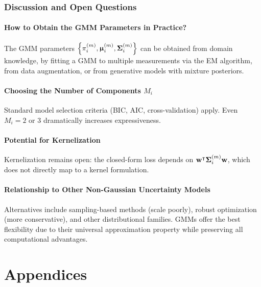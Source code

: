 \documentclass[11pt, letterpaper]{article}
\newcommand{\bSigma}{\vb{\Sigma}}
\newcommand{\bmu}{\boldsymbol{\upmu}}
\begin{document}
\section{Discussion and Open Questions}\label{sec:discussion}

\subsection{How to Obtain the GMM Parameters in Practice?}

The GMM parameters $\left\{\pi_i^{(m)}, \bmu_i^{(m)}, \bSigma_i^{(m)}\right\}$ can be obtained from domain knowledge, by fitting a GMM to multiple measurements via the EM algorithm, from data augmentation, or from generative models with mixture posteriors.

\subsection{Choosing the Number of Components $M_i$}

Standard model selection criteria (BIC, AIC, cross-validation) apply. Even $M_i = 2$ or $3$ dramatically increases expressiveness.

\subsection{Potential for Kernelization}

Kernelization remains open: the closed-form loss depends on $\vb{w}^{\intercal} \bSigma_i^{(m)} \vb{w}$, which does not directly map to a kernel formulation.

\subsection{Relationship to Other Non-Gaussian Uncertainty Models}

Alternatives include sampling-based methods (scale poorly), robust optimization (more conservative), and other distributional families. GMMs offer the best flexibility due to their universal approximation property while preserving all computational advantages.

\appendix

\part*{Appendices}
\end{document}
